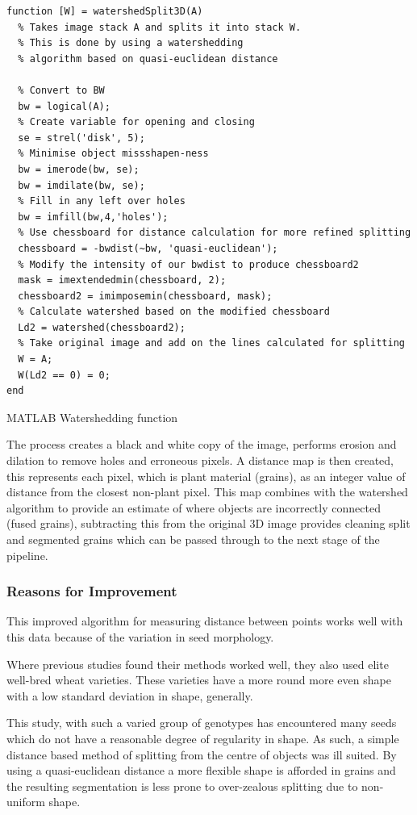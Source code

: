 \documentclass[11pt]{report}
\begin{document}
\begin{listing}[htbp]
\begin{verbatim}
function [W] = watershedSplit3D(A)
  % Takes image stack A and splits it into stack W.
  % This is done by using a watershedding
  % algorithm based on quasi-euclidean distance

  % Convert to BW
  bw = logical(A);
  % Create variable for opening and closing
  se = strel('disk', 5);
  % Minimise object missshapen-ness
  bw = imerode(bw, se);
  bw = imdilate(bw, se);
  % Fill in any left over holes
  bw = imfill(bw,4,'holes');
  % Use chessboard for distance calculation for more refined splitting
  chessboard = -bwdist(~bw, 'quasi-euclidean');
  % Modify the intensity of our bwdist to produce chessboard2
  mask = imextendedmin(chessboard, 2);
  chessboard2 = imimposemin(chessboard, mask);
  % Calculate watershed based on the modified chessboard
  Ld2 = watershed(chessboard2);
  % Take original image and add on the lines calculated for splitting
  W = A;
  W(Ld2 == 0) = 0;
end
\end{verbatim}
\caption{\label{orgde9e39b}
MATLAB Watershedding function}
\end{listing}

The process creates a black and white copy of the image, performs erosion and dilation to remove holes and erroneous pixels. A distance map is then created, this represents each pixel, which is plant material (grains), as an integer value of distance from the closest non-plant pixel. This map combines with the watershed algorithm to provide an estimate of where objects are incorrectly connected (fused grains), subtracting this from the original 3D image provides cleaning split and segmented grains which can be passed through to the next stage of the pipeline.

\subsubsection{Reasons for Improvement}
\label{sec:orgc36d504}

This improved algorithm for measuring distance between points works well with this data because of the variation in seed morphology.

Where previous studies \cite{Hughes2017} found their methods worked well, they also used elite well-bred wheat varieties. These varieties have a more round more even shape with a low standard deviation in shape, generally.

This study, with such a varied group of genotypes has encountered many seeds which do not have a reasonable degree of regularity in shape. As such, a simple distance based method of splitting from the centre of objects was ill suited. By using a quasi-euclidean distance a more flexible shape is afforded in grains and the resulting segmentation is less prone to over-zealous splitting due to non-uniform shape.
\end{document}
